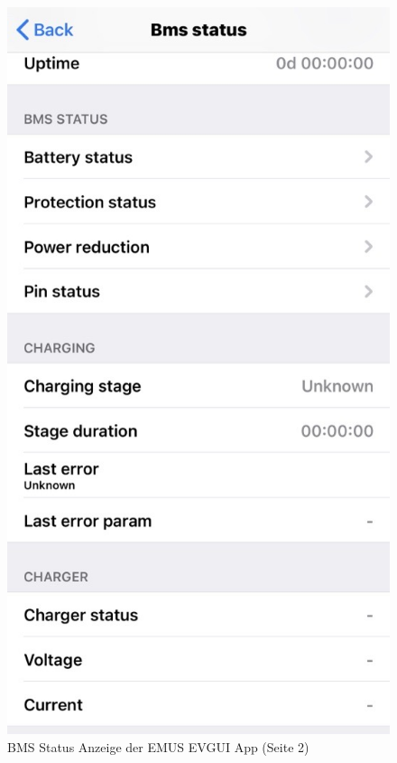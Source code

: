 \begin{figure}[H]
	\begin{center}
		\includegraphics[scale=0.4]{figures/Akku/BMSStatus2.png}
		\caption{BMS Status Anzeige der EMUS EVGUI App (Seite 2)\cite{BMSStatusApp2}}
		\label{fig: BMS Status Anzeige der EMUS EVGUI App (Seite 2)}
	\end{center}
\end{figure}

